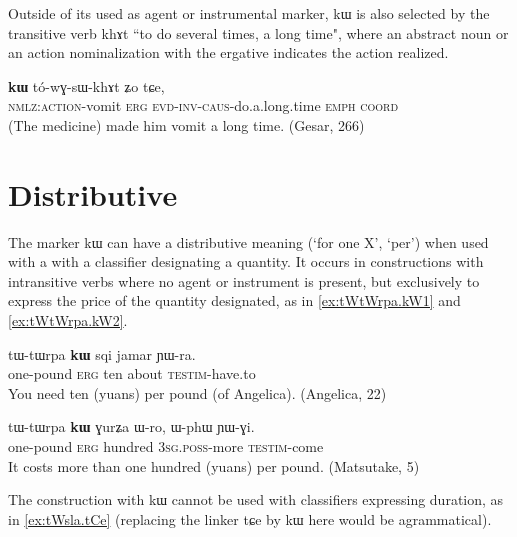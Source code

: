 \documentclass[oldfontcommands,oneside,a4paper,11pt]{article}
\newcommand{\ipa}[1]{{\phon #1}} %
\begin{document}
 
 

 Outside of its used as agent or instrumental marker, \ipa{kɯ} is also selected by the transitive verb \ipa{khɤt} ``to do several times, a long time", where an abstract noun or an action nominalization with the ergative indicates the action realized.
 \begin{exe} 
\ex \label{ex:instr5}
\gll   \ipa{tɯ-qioʁ}   	\ipa{\textbf{kɯ}}   	\ipa{tó-wɣ-sɯ-khɤt}   	\ipa{ʑo}   	\ipa{tɕe,}       \\
  \textsc{nmlz:action}-vomit \textsc{erg} \textsc{evd-inv-caus}-do.a.long.time \textsc{emph} \textsc{coord}\\
 \glt  (The medicine) made him vomit a long time. (Gesar, 266)
\end{exe}  
 
 
\section{Distributive} \label{sec:distributive}
The marker \ipa{kɯ} can have   a distributive meaning (`for one X', `per') when used with a with a classifier designating a quantity. It occurs  in constructions with intransitive verbs where no agent or instrument is present, but exclusively to express the price of the quantity designated, as in  \ref{ex:tWtWrpa.kW1} and \ref{ex:tWtWrpa.kW2}.

 \begin{exe} 
\ex \label{ex:tWtWrpa.kW1}
\gll  
\ipa{tɯ-tɯrpa} 	\ipa{\textbf{kɯ}} 	\ipa{sqi} 	\ipa{jamar} 	\ipa{ɲɯ-ra.} 	\\
one-pound \textsc{erg} ten about \textsc{testim}-have.to \\
\glt You need ten (yuans) per pound (of Angelica). (Angelica, 22)
\end{exe}  

 \begin{exe} 
\ex \label{ex:tWtWrpa.kW2}
\gll  
\ipa{tɯ-tɯrpa}  	\ipa{\textbf{kɯ}}  	\ipa{ɣurʑa}  	\ipa{ɯ-ro,}  	\ipa{ɯ-phɯ}  	\ipa{ɲɯ-ɣi.}  \\
one-pound \textsc{erg} hundred \textsc{3sg.poss}-more \textsc{testim}-come \\
\glt It costs more than one hundred (yuans) per pound. (Matsutake, 5)
\end{exe}  
 
The construction with \ipa{kɯ} cannot be used with classifiers expressing duration, as in \ref{ex:tWsla.tCe} (replacing the linker \ipa{tɕe} by \ipa{kɯ} here would be agrammatical).
 
\end{document}
